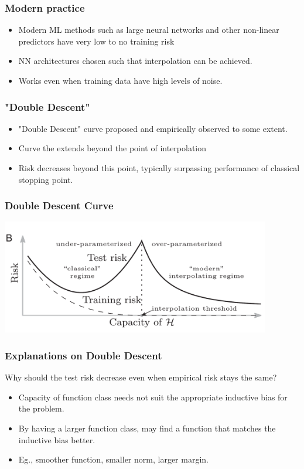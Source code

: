 \documentclass{beamer}
\begin{document}
\begin{frame}
\frametitle{Modern practice}
\begin{itemize}[itemsep = 12pt]
	\item Modern ML methods such as large neural networks and other non-linear predictors have very low to no training risk
	\item NN architectures chosen such that interpolation can be achieved.
	\item Works even when training data have high levels of noise.
\end{itemize}
\end{frame}

\begin{frame}
\frametitle{"Double Descent"}
\begin{itemize}[itemsep = 12pt]
	\item "Double Descent" curve proposed and empirically observed to some extent.
	\item Curve the extends beyond the point of interpolation
	\item Risk decreases beyond this point, typically surpassing performance of classical stopping point.
\end{itemize}
\end{frame}

\begin{frame}
\frametitle{Double Descent Curve}
\includegraphics[height=5cm]{Double-Descent-Curve.png}
\end{frame}

\begin{frame}
\frametitle{Explanations on Double Descent}
Why should the test risk decrease even when empirical risk stays the same?\\
\begin{itemize}[itemsep = 12pt]
	\item Capacity of function class needs not suit the appropriate inductive bias for the problem.
	\item By having a larger function class, may find a function that matches the inductive bias better.
	\item Eg., smoother function, smaller norm, larger margin.
\end{itemize}

\end{frame}
\end{document}
